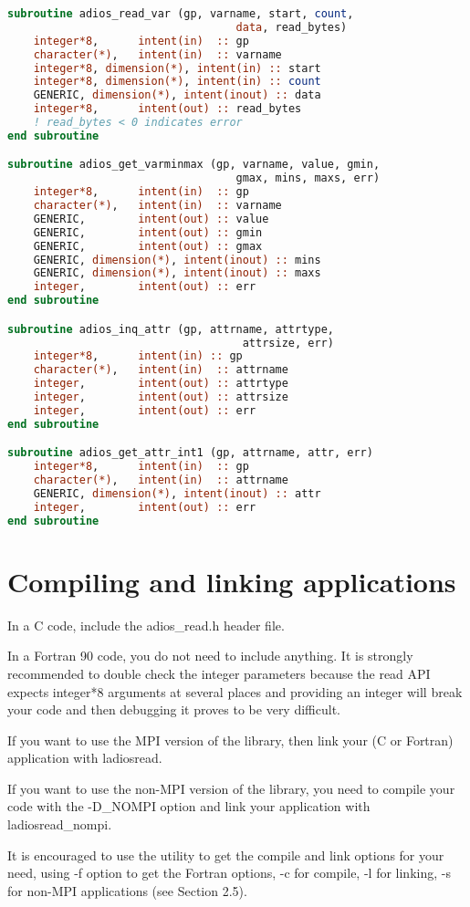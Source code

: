 \begin{lstlisting}[language=Fortran]
subroutine adios_read_var (gp, varname, start, count,
                                   data, read_bytes)
    integer*8,      intent(in)  :: gp
    character(*),   intent(in)  :: varname
    integer*8, dimension(*), intent(in) :: start
    integer*8, dimension(*), intent(in) :: count
    GENERIC, dimension(*), intent(inout) :: data
    integer*8,      intent(out) :: read_bytes
    ! read_bytes < 0 indicates error
end subroutine

subroutine adios_get_varminmax (gp, varname, value, gmin, 
                                   gmax, mins, maxs, err)
    integer*8,      intent(in)  :: gp
    character(*),   intent(in)  :: varname
    GENERIC,        intent(out) :: value
    GENERIC,        intent(out) :: gmin
    GENERIC,        intent(out) :: gmax
    GENERIC, dimension(*), intent(inout) :: mins
    GENERIC, dimension(*), intent(inout) :: maxs
    integer,        intent(out) :: err
end subroutine

subroutine adios_inq_attr (gp, attrname, attrtype, 
                                    attrsize, err)
    integer*8,      intent(in) :: gp
    character(*),   intent(in)  :: attrname
    integer,        intent(out) :: attrtype
    integer,        intent(out) :: attrsize
    integer,        intent(out) :: err
end subroutine

subroutine adios_get_attr_int1 (gp, attrname, attr, err)
    integer*8,      intent(in)  :: gp
    character(*),   intent(in)  :: attrname
    GENERIC, dimension(*), intent(inout) :: attr
    integer,        intent(out) :: err 
end subroutine
\end{lstlisting}\label{HToc182553414}

\section{Compiling and linking applications}

In a C code, include the adios\_read.h header file. 

In a Fortran 90 code, you do not need to include anything. It is strongly recommended 
to double check the integer parameters because the read API expects integer*8 arguments 
at several places and providing an integer will break your code and then debugging 
it proves to be very difficult.

If you want to use the MPI version of the library, then link your (C or Fortran) 
application with \-{}ladiosread.

If you want to use the non-MPI version of the library, you need to compile your 
code with the -D\_NOMPI option and link your application with \-{}ladiosread\_nompi.

It is encouraged to use the utility to get the compile and link options for your 
need, using -f option to get the Fortran options, -c for compile, -l for linking, 
-s for non-MPI applications (see Section 2.5). \label{HToc182553415}

